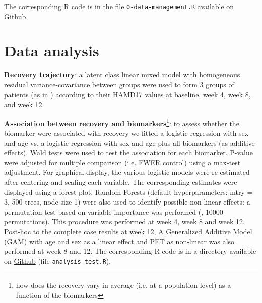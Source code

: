 \documentclass[12pt]{article}
\begin{document}
\bigskip

The corresponding R code is in the file \texttt{0-data-management.R} available on \href{https://github.com/bozenne/article-predictionNP1BD3/blob/master/code-data-analysis/0-data-management.R}{Github}.
\section{Data analysis}
\label{sec:org3e51687}

\noindent \textbf{Recovery trajectory}: a latent class linear mixed model
with homogeneous residual variance-covariance between groups were used
to form 3 groups of patients (as in \cite{goerigk2021distinct})
according to their HAMD17 values at baseline, week 4, week 8, and
week 12.

\clearpage

\noindent \textbf{Association between recovery and biomarkers}\footnote{how does
the recovery vary in average (i.e. at a population level) as a
function of the biomarkers}: to assess whether the biomarker were
associated with recovery we fitted a logistic regression with sex and
age vs. a logistic regression with sex and age plus all biomarkers (as
additive effects). Wald tests were used to test the association for
each biomarker. P-value were adjusted for multiple comparison
(i.e. FWER control) using a max-test adjustment. For graphical
display, the various logistic models were re-estimated after centering
and scaling each variable. The corresponding estimates were displayed
using a forest plot. \newline Random Forests (default hyperparameters:
mtry = 3, 500 trees, node size 1) were also used to identify possible
non-linear effects: a permutation test based on variable importance
was performed (\cite{altmann2010permutation}, 10000
permutations). \newline This procedure was performed at week 4, week 8
and week 12. Post-hoc to the complete case results at week 12, A
Generalized Additive Model (GAM) with age and sex as a linear effect
and PET as non-linear was also performed at week 8 and 12. \newline
The corresponding R code is in a directory available on \href{https://github.com/bozenne/article-predictionNP1BD3/tree/master/code-data-analysis}{Github} (file
\texttt{analysis-test.R}).



\bigskip
\end{document}
